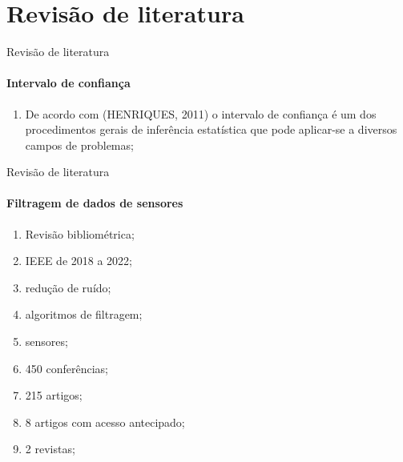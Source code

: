 \documentclass[]{beamer}
\begin{document}

\section{Revisão de literatura}

	

\begin{frame}{Revisão de literatura}
	\framesubtitle{Intervalo de confiança}
	
	\begin{enumerate}
		\item De acordo com (HENRIQUES, 2011) o intervalo de confiança é um dos procedimentos gerais de inferência estatística que pode aplicar-se a diversos campos de problemas;
	\end{enumerate}
		
\end{frame}

\begin{frame}{Revisão de literatura}
	\framesubtitle{Filtragem de dados de sensores}
	
	\begin{enumerate}
		\item Revisão bibliométrica;
		\item IEEE de 2018 a 2022;
		\item redução de ruído; 
		\item algoritmos de filtragem;
		\item sensores;
		\item 450 conferências;
		\item 215 artigos;
		\item 8 artigos com acesso antecipado;
		\item 2 revistas;
	\end{enumerate}
		
\end{frame}
\end{document}
